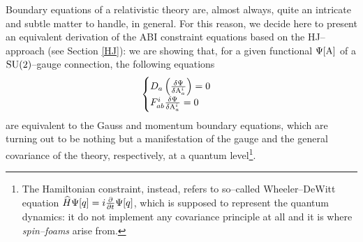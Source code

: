 Boundary equations of a relativistic theory are, almost always, quite an intricate and subtle matter to handle, in general. For this reason, we decide here to present an equivalent derivation of the ABI constraint equations based on the HJ--approach (see Section \ref{HJ}): we are showing that, for a given functional $\Psi[\text{\normalfont A}]$ of a $\text{\normalfont SU}(2)$--gauge connection, the following equations
\begin{equation}\label{constr_eqs_psi}
    \begin{cases}
    D_a\left(\frac{\delta\Psi}{\delta\text{\normalfont\scriptsize{A}}^i_a}\right)=0\\
    F^i_{ab}\frac{\delta\Psi}{\delta\text{\normalfont\scriptsize{A}}^i_a}=0\\
\end{cases}
\end{equation}
are equivalent to the Gauss and momentum boundary equations, which are turning out to be nothing but a manifestation of the gauge and the general covariance of the theory, respectively, at a quantum level\footnote{The Hamiltonian constraint, instead, refers to so--called Wheeler--DeWitt equation $\widehat{H}\Psi[q]=i\frac{\partial}{\partial t}\Psi[q]$, which is supposed to represent the quantum dynamics: it do not implement any covariance principle at all and it is where \emph{spin--foams} arise from.}.

